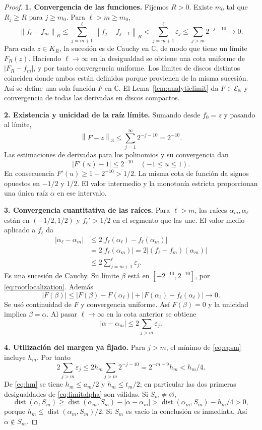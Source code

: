 \documentclass[11pt,a4paper]{article}
\numberwithin{equation}{section}
\theoremstyle{definition}
\theoremstyle{remark}
\newcommand{\R}{\mathbb R}
\newcommand{\C}{\mathbb C}
\newcommand{\ER}{\mathcal E_{\R}}
\newcommand{\norm}[1]{\left\lVert#1\right\rVert}
\DeclareMathOperator{\dist}{dist}
\newcommand{\paso}[1]{\par\smallskip\noindent\textbf{#1}\quad}
\begin{document}
\begin{proof}
\paso{1. Convergencia de las funciones.}
Fijemos $R>0$. Existe $m_0$ tal que $R_j\ge R$ para $j\ge m_0$. Para $\ell>m\ge m_0$,
\[
\norm{f_\ell-f_m}_R
\le\sum_{j=m+1}^{\ell}\norm{f_j-f_{j-1}}_R
<\sum_{j=m+1}^{\ell}\varepsilon_j
\le\sum_{j>m}2^{-j-10}\longrightarrow0.
\]
Para cada $z\in K_R$, la sucesión es de Cauchy en $\C$, de modo que tiene un límite $F_R(z)$. Haciendo $\ell\to\infty$ en la desigualdad se obtiene una cota uniforme de $|F_R-f_m|$, y por tanto convergencia uniforme. Los límites de discos distintos coinciden donde ambos están definidos porque provienen de la misma sucesión. Así se define una sola función $F$ en $\C$. El Lema~\ref{lem:analyticlimit} da $F\in\ER$ y convergencia de todas las derivadas en discos compactos.

\paso{2. Existencia y unicidad de la raíz límite.}
Sumando desde $f_0=z$ y pasando al límite,
\[
\norm{F-z}_3\le\sum_{j=1}^\infty2^{-j-10}=2^{-10}.
\]
Las estimaciones de derivadas para los polinomios y su convergencia dan
\[
|F'(u)-1|\le2^{-10}\quad(-1\le u\le1).
\]
En consecuencia $F'(u)\ge1-2^{-10}>1/2$. La misma cota de función da signos opuestos en $-1/2$ y $1/2$. El valor intermedio y la monotonía estricta proporcionan una única raíz $\alpha$ en ese intervalo.

\paso{3. Convergencia cuantitativa de las raíces.}
Para $\ell>m$, las raíces $\alpha_m,\alpha_\ell$ están en $(-1/2,1/2)$ y $f_\ell'>1/2$ en el segmento que las une. El valor medio aplicado a $f_\ell$ da
\begin{align*}
|\alpha_\ell-\alpha_m|
&\le2|f_\ell(\alpha_\ell)-f_\ell(\alpha_m)|\\
&=2|f_\ell(\alpha_m)|
=2|(f_\ell-f_m)(\alpha_m)|\\
&\le2\sum_{j=m+1}^{\ell}\varepsilon_j.
\end{align*}
Es una sucesión de Cauchy. Su límite $\beta$ está en $[-2^{-10},2^{-10}]$, por \eqref{eq:rootlocalization}. Además
\[
|F(\beta)|\le |F(\beta)-F(\alpha_\ell)|+
|F(\alpha_\ell)-f_\ell(\alpha_\ell)|\longrightarrow0.
\]
Se usó continuidad de $F$ y convergencia uniforme. Así $F(\beta)=0$ y la unicidad implica $\beta=\alpha$. Al pasar $\ell\to\infty$ en la cota anterior se obtiene
\[
|\alpha-\alpha_m|\le2\sum_{j>m}\varepsilon_j.
\]

\paso{4. Utilización del margen ya fijado.}
Para $j>m$, el mínimo de \eqref{eq:epsm} incluye $h_m$. Por tanto
\[
2\sum_{j>m}\varepsilon_j
\le2h_m\sum_{j>m}2^{-j-10}
=2^{-m-9}h_m<h_m/4.
\]
De \eqref{eq:hm} se tiene $h_m\le a_m/2$ y $h_m\le t_m/2$; en particular las dos primeras desigualdades de \eqref{eq:limitalpha} son válidas. Si $S_m\ne\varnothing$,
\[
\dist(\alpha,S_m)\ge\dist(\alpha_m,S_m)-|\alpha-\alpha_m|
>\dist(\alpha_m,S_m)-h_m/4>0,
\]
porque $h_m\le\dist(\alpha_m,S_m)/2$. Si $S_m$ es vacío la conclusión es inmediata. Así $\alpha\notin S_m$.
\end{proof}
\end{document}
